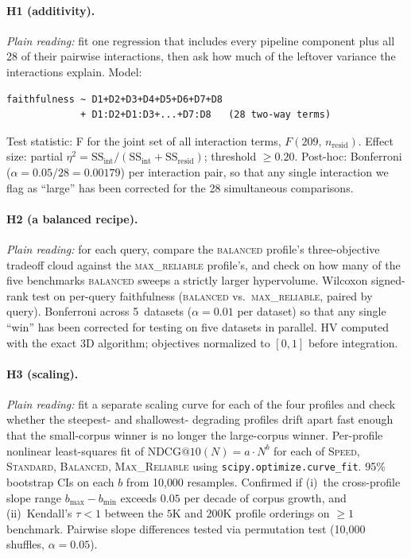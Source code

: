 \paragraph{H1 (additivity).}
\emph{Plain reading:} fit one regression that includes every
pipeline component plus all 28 of their pairwise interactions, then
ask how much of the leftover variance the interactions explain.
Model:
{\small
\begin{verbatim}
faithfulness ~ D1+D2+D3+D4+D5+D6+D7+D8
             + D1:D2+D1:D3+...+D7:D8   (28 two-way terms)
\end{verbatim}
}
\vspace{-0.5em}
Test statistic: F for the joint set of all interaction terms,
$F(209,\, n_\text{resid})$.  Effect size: partial
$\eta^2 = \text{SS}_\text{int} / (\text{SS}_\text{int} +
\text{SS}_\text{resid})$; threshold $\geq 0.20$.  Post-hoc:
Bonferroni ($\alpha = 0.05/28 = 0.00179$) per interaction pair, so
that any single interaction we flag as ``large'' has been corrected
for the 28 simultaneous comparisons.

\paragraph{H2 (a balanced recipe).}
\emph{Plain reading:} for each query, compare the
\textsc{balanced} profile's three-objective tradeoff cloud against
the \textsc{max\_reliable} profile's, and check on how many of the
five benchmarks \textsc{balanced} sweeps a strictly larger
hypervolume.  Wilcoxon signed-rank test on per-query faithfulness
(\textsc{balanced} vs.\ \textsc{max\_reliable}, paired by query).
Bonferroni across 5~datasets ($\alpha = 0.01$ per dataset) so that
any single ``win'' has been corrected for testing on five datasets
in parallel.  HV computed with the exact 3D algorithm; objectives
normalized to $[0,1]$ before integration.

\paragraph{H3 (scaling).}
\emph{Plain reading:} fit a separate scaling curve for each of the
four profiles and check whether the steepest- and shallowest-
degrading profiles drift apart fast enough that the small-corpus
winner is no longer the large-corpus winner.  Per-profile nonlinear
least-squares fit of $\text{NDCG@10}(N) = a \cdot N^b$ for each of
\textsc{Speed}, \textsc{Standard}, \textsc{Balanced},
\textsc{Max\_Reliable} using \texttt{scipy.optimize.curve\_fit}.
95\% bootstrap CIs on each $b$ from 10{,}000 resamples.  Confirmed
if (i)~the cross-profile slope range $b_{\max} - b_{\min}$ exceeds
$0.05$ per decade of corpus growth, and (ii)~Kendall's $\tau < 1$
between the $5$K and $200$K profile orderings on $\geq 1$ benchmark.
Pairwise slope differences tested via permutation test (10{,}000
shuffles, $\alpha = 0.05$).

